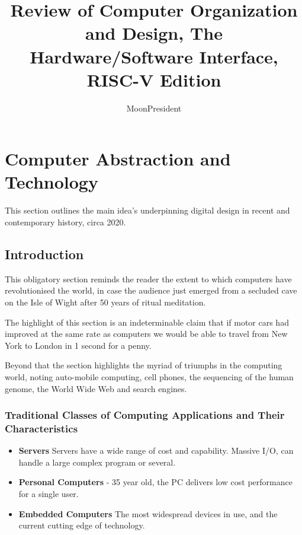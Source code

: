\documentclass{article}
\title{Review of Computer Organization and Design, The Hardware/Software Interface, RISC-V Edition}
\author{MoonPresident}
\begin{document}
	\maketitle
	\tableofcontents
	
	\section{Computer Abstraction and Technology}
	This section outlines the main idea's underpinning digital design in recent and contemporary history, circa 2020.
		\subsection{Introduction}
			This obligatory section reminds the reader the extent to which computers have revolutionised the world, in case the audience just emerged from a secluded cave on the Isle of Wight after 50 years of ritual meditation. 
			
			The highlight of this section is an indeterminable claim that if motor cars had improved at the same rate as computers we would be able to travel from New York to London in 1 second for a penny.
			
			Beyond that the section highlights the myriad of triumphs in the computing world, noting auto-mobile computing, cell phones, the sequencing of the human genome, the World Wide Web and search engines.
			
			\subsubsection{Traditional Classes of Computing Applications and Their Characteristics}
			\begin{itemize}
				\item \textbf{Servers} Servers have a wide range of cost and capability. Massive I/O, can handle a large complex program or several.
				\item \textbf{Personal Computers} - 35 year old, the PC delivers low cost performance for a single user.
				\item \textbf{Embedded Computers} The most widespread devices in use, and the current cutting edge of technology.
			\end{itemize}
\end{document}
